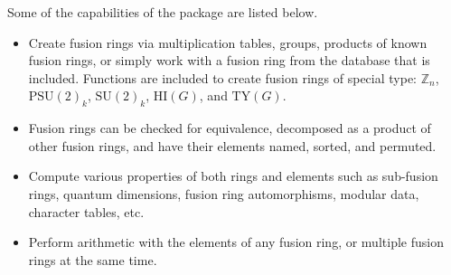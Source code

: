 Some of the capabilities of the package are listed below.
\begin{itemize}
   \item Create fusion rings via multiplication tables, groups, products of known fusion rings, or simply work with a fusion ring from the database that is included. Functions are included to create fusion rings of special type: $\mathbb{Z}_n$, $\text{PSU}(2)_k$, $\text{SU}(2)_k$, $\text{HI}(G)$, and $\text{TY}(G)$.
   \item Fusion rings can be checked for equivalence, decomposed as a product of other fusion rings, and have their elements named, sorted, and permuted.
   \item Compute various properties of both rings and elements such as sub-fusion rings, quantum dimensions, fusion ring automorphisms, modular data, character tables, etc.
   \item Perform arithmetic with the elements of any fusion ring, or multiple fusion rings at the same time.
\end{itemize}
